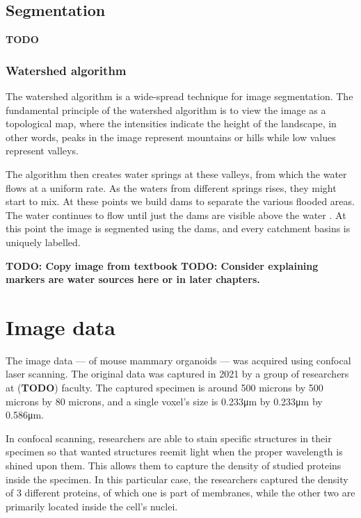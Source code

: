 \documentclass[
  digital,     %
  oneside,     %
  nosansbold,  %
  nocolorbold, %
  lof,         %
  lot,         %
]{fithesis4}
\begin{document}
\section{Segmentation}

\textbf{TODO}

\subsection{Watershed algorithm}

The watershed algorithm is a wide-spread technique for image segmentation. The
fundamental principle of the watershed algorithm is to view the image as a
topological map, where the intensities indicate the height of the landscape, in
other words, peaks in the image represent mountains or hills while low values
represent valleys.

The algorithm then creates water springs at these valleys, from which the water
flows at a uniform rate. As the waters from different springs rises, they might
start to mix. At these points we build dams to separate the various flooded
areas. The water continues to flow until just the dams are visible above the
water \cite{gonzalez2002}. At this point the image is segmented using the dams,
and every catchment basins is uniquely labelled.

\textbf{TODO: Copy image from textbook}
\textbf{TODO: Consider explaining markers are water sources here or in later
chapters.}

\chapter{Image data}

The image data --- of mouse mammary organoids --- was acquired using confocal
laser scanning. The original data was captured in 2021 by a group of
researchers at (\textbf{TODO}) faculty. The captured specimen is around 500
microns by 500 microns by 80 microns, and a single voxel's size is 0.233μm by
0.233μm by 0.586μm.

In confocal scanning, researchers are able to stain specific structures in
their specimen so that wanted structures reemit light when the proper wavelength
is shined upon them. This allows them to capture the density of studied proteins
inside the specimen. In this particular case, the researchers captured the
density of 3 different proteins, of which one is part of membranes, while the
other two are primarily located inside the cell's nuclei.
\end{document}
